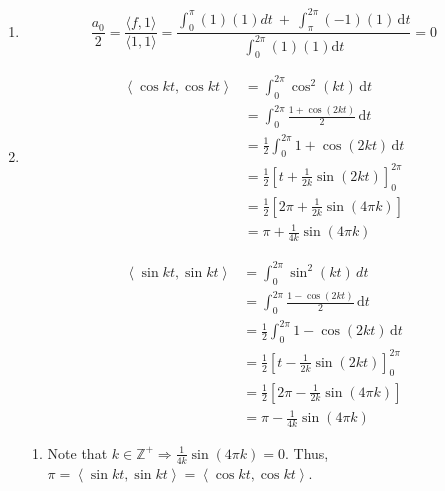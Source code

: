 \documentclass[letter,11pt]{article}
\theoremstyle{definition}
\begin{document}
\begin{tcolorbox}[boxrule=1mm,enhanced jigsaw, breakable,before=\hfill,after=\hfill,adjusted title={Problem 6 solutions}]
    \begin{enumerate}[label = \roman*.]
        \item $$\boxed{\frac{a_{0}}{2}=\frac{\langle f, 1\rangle}{\langle 1,1\rangle} = \frac{\int_{0}^{\pi}\left(1\right)\left(1\right)dt\ +\ \int_{\pi}^{2\pi}\left(-1\right)\left(1\right) \, \mathrm{d}t}{\int_{0}^{2\pi}\left(1\right)\left(1\right) \mathrm{d}t} = 0 }$$
        \item 

        \begin{minipage}{0.5\textwidth}
    \begin{align*}
        \left\langle \cos k t, \cos k t \right\rangle &= \int_{0}^{2\pi} \cos^2(k t) \, \mathrm{d}t \\
        &= \int_{0}^{2\pi} \frac{1 + \cos(2kt)}{2} \, \mathrm{d}t \\
        &= \frac{1}{2}\int_{0}^{2\pi} 1 + \cos(2kt) \, \mathrm{d}t \\
        &= \frac{1}{2}\left[t + \frac{1}{2k}\sin(2kt)\right]_{0}^{2\pi} \\
        &= \frac{1}{2}\left[2\pi+\frac{1}{2k}\sin\left(4\pi k\right)\right] \\
        &= \pi+\frac{1}{4k}\sin\left(4\pi k\right)
    \end{align*}
\end{minipage}%
\begin{minipage}{0.5\textwidth}
    \begin{align*}
        \left\langle \sin k t, \sin k t \right\rangle &= \int_{0}^{2\pi} \sin^2(k t) \, dt \\
        &= \int_{0}^{2\pi} \frac{1 - \cos(2kt)}{2} \, \mathrm{d}t \\
        &= \frac{1}{2}\int_{0}^{2\pi} 1 - \cos(2kt) \, \mathrm{d}t \\
        &= \frac{1}{2}\left[t - \frac{1}{2k}\sin(2kt)\right]_{0}^{2\pi} \\
        &= \frac{1}{2}\left[2\pi-\frac{1}{2k}\sin\left(4\pi k\right)\right] \\
        &= \pi-\frac{1}{4k}\sin\left(4\pi k\right)
    \end{align*}
\end{minipage}
\begin{enumerate}
    \item Note that $k \in \mathbb{Z}^{+} \Longrightarrow \frac{1}{4k}\sin\left(4\pi k\right) = 0$. Thus, $\boxed{\pi = \left\langle \sin k t, \sin k t \right\rangle = \left\langle \cos k t, \cos k t \right\rangle}$.
\end{enumerate}


\end{enumerate}
\end{tcolorbox}
\end{document}
